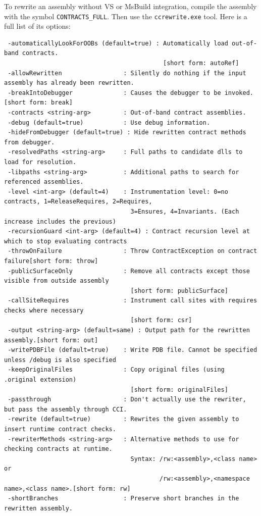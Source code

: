 \documentclass{article}
\newcommand{\code}[1]{\lstinline{#1}}
\begin{document}
To rewrite an assembly without VS or MsBuild integration, compile the
assembly with the symbol \code{CONTRACTS_FULL}. Then use the
\code{ccrewrite.exe} tool. Here is a full list of its options:
{\small
\begin{verbatim}
 -automaticallyLookForOOBs (default=true) : Automatically load out-of-band contracts.
                                            [short form: autoRef]
 -allowRewritten                 : Silently do nothing if the input assembly has already been rewritten.
 -breakIntoDebugger              : Causes the debugger to be invoked.[short form: break]
 -contracts <string-arg>         : Out-of-band contract assemblies.
 -debug (default=true)           : Use debug information.
 -hideFromDebugger (default=true) : Hide rewritten contract methods from debugger.
 -resolvedPaths <string-arg>     : Full paths to candidate dlls to load for resolution.
 -libpaths <string-arg>          : Additional paths to search for referenced assemblies.
 -level <int-arg> (default=4)    : Instrumentation level: 0=no contracts, 1=ReleaseRequires, 2=Requires,
                                   3=Ensures, 4=Invariants. (Each increase includes the previous)
 -recursionGuard <int-arg> (default=4) : Contract recursion level at which to stop evaluating contracts
 -throwOnFailure                 : Throw ContractException on contract failure[short form: throw]
 -publicSurfaceOnly              : Remove all contracts except those visible from outside assembly
                                   [short form: publicSurface]
 -callSiteRequires               : Instrument call sites with requires checks where necessary
                                   [short form: csr]
 -output <string-arg> (default=same) : Output path for the rewritten assembly.[short form: out]
 -writePDBFile (default=true)    : Write PDB file. Cannot be specified unless /debug is also specified
 -keepOriginalFiles              : Copy original files (using .original extension)
                                   [short form: originalFiles]
 -passthrough                    : Don't actually use the rewriter, but pass the assembly through CCI.
 -rewrite (default=true)         : Rewrites the given assembly to insert runtime contract checks.
 -rewriterMethods <string-arg>   : Alternative methods to use for checking contracts at runtime.
                                   Syntax: /rw:<assembly>,<class name> or
                                           /rw:<assembly>,<namespace name>,<class name>.[short form: rw]
 -shortBranches                  : Preserve short branches in the rewritten assembly.

\end{verbatim}}
\end{document}
